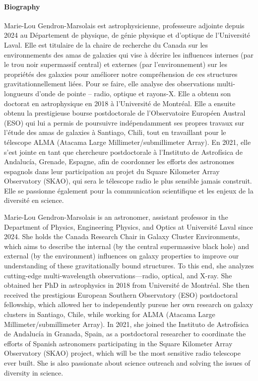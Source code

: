 \paragraph{Biography}
{\sffamily
Marie-Lou Gendron-Marsolais est astrophysicienne, professeure adjointe depuis 2024 au Département de physique, de génie physique et d'optique de l'Université Laval. Elle est titulaire de la chaire de recherche du Canada sur les environnements des amas de galaxies qui vise à décrire les influences internes (par le trou noir supermassif central) et externes (par l'environnement) sur les propriétés des galaxies pour améliorer notre compréhension de ces structures gravitationnellement liées. Pour se faire, elle analyse des observations multi-longueurs d'onde de pointe – radio, optique et rayons-X. Elle a obtenu son doctorat en astrophysique en 2018 à l'Université de Montréal. Elle a ensuite obtenu la prestigieuse bourse postdoctorale de l'Observatoire Européen Austral (ESO) qui lui a permis de poursuivre indépendamment ses propres travaux sur l'étude des amas de galaxies à Santiago, Chili, tout en travaillant pour le télescope ALMA (Atacama Large Millimeter/submillimeter Array). En 2021, elle s'est jointe en tant que chercheure postdoctorale à l'Instituto de Astrofísica de Andalucía, Grenade, Espagne, afin de coordonner les efforts des astronomes espagnols dans leur participation au projet du Square Kilometer Array Observatory (SKAO), qui sera le télescope radio le plus sensible jamais construit. Elle se passionne également pour la communication scientifique et les enjeux de la diversité en science.

Marie-Lou Gendron-Marsolais is an astronomer, assistant professor in the Department of Physics, Engineering Physics, and Optics at Université Laval since 2024. She holds the Canada Research Chair in Galaxy Cluster Environments, which aims to describe the internal (by the central supermassive black hole) and external (by the environment) influences on galaxy properties to improve our understanding of these gravitationally bound structures. To this end, she analyzes cutting-edge multi-wavelength observations—radio, optical, and X-ray. She obtained her PhD in astrophysics in 2018 from Université de Montréal. She then received the prestigious European Southern Observatory (ESO) postdoctoral fellowship, which allowed her to independently pursue her own research on galaxy clusters in Santiago, Chile, while working for ALMA (Atacama Large Millimeter/submillimeter Array). In 2021, she joined the Instituto de Astrofísica de Andalucía in Granada, Spain, as a postdoctoral researcher to coordinate the efforts of Spanish astronomers participating in the Square Kilometer Array Observatory (SKAO) project, which will be the most sensitive radio telescope ever built. She is also passionate about science outreach and solving the issues of diversity in science.
}

